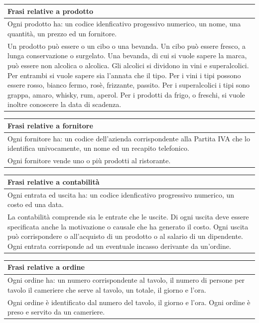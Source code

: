 \begin{longtable}{|p{ 17cm}|}
    \hline
    \textbf{Frasi relative a prodotto} \\ \hline
    Ogni prodotto ha: un codice idenficativo progessivo numerico, un nome, una quantità, un prezzo ed un fornitore.\\
    Un prodotto può essere o un cibo o una bevanda.
    Un cibo può essere fresco, a lunga conservazione o surgelato.
    Una bevanda, di cui si vuole sapere la marca, può essere non alcolica o alcolica. Gli
    alcolici si dividono in vini e superalcolici. Per entrambi si vuole sapere sia l’annata che
    il tipo.
    Per i vini i tipi possono essere rosso, bianco fermo, rosè, frizzante, passito. Per i
    superalcolici i tipi sono grappa, amaro, whisky, rum, aperol.
    Per i prodotti da frigo, o freschi, si vuole inoltre conoscere la data di scadenza.\\ \hline
\end{longtable}

\begin{longtable}{|p{17cm}|}
    \hline
    \textbf{Frasi relative a fornitore} \\ \hline
    Ogni fornitore ha: un codice dell'azienda corrispondente alla Partita IVA che lo identifica univocamente, un nome ed un recapito telefonico.\\
    Ogni fornitore vende uno o più prodotti al ristorante.
    \\ \hline
\end{longtable}

\begin{longtable}{|p{17cm}|}
    \hline
    \textbf{Frasi relative a contabilità} \\ \hline
    Ogni entrata ed uscita ha: un codice idenficativo progressivo numerico, un costo ed una data.\\
    La contabilità comprende sia le entrate che le uscite.
    Di ogni uscita deve essere specificata anche la motivazione o causale che ha generato
    il costo.
    Ogni uscita può corrispondere o all’acquisto di un prodotto o al salario di un dipendente.
    Ogni entrata corrisponde ad un eventuale incasso derivante da un’ordine.
    \\ \hline
\end{longtable}

\begin{longtable}{|p{17 cm}|}
    \hline
    \textbf{Frasi relative a ordine} \\ \hline
    Ogni ordine ha: un numero corrispondente al tavolo, il numero di persone per tavolo il cameriere che serve al tavolo, un totale, il giorno e l'ora. \\
    Ogni ordine è identificato dal numero del tavolo, il giorno e l’ora.
    Ogni ordine è preso e servito da un cameriere.
    \\ \hline
\end{longtable}

